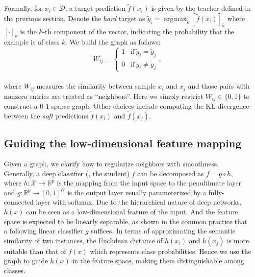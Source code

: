 \documentclass[10pt,twocolumn,letterpaper]{article}
\DeclareMathOperator*{\argmax}{\arg\!\max}
\begin{document}
Formally, for $x_i \in \mathcal{D}$, a target prediction $\tilde f(x_i)$ is given by the teacher defined in the previous section. Denote the \emph{hard} target as ${\tilde{y}}_{i} = \argmax_k\left[ \tilde{f}(x_i)\right] _k$ where $\left[ \cdot\right] _k$ is the $k$-th component of the vector, indicating the probability that the example is of class $k$. We build the graph as follows:\\[-.3cm]
\begin{equation}\label{eq:W}
W_{ij} = \left \{ \begin{array}{ll}
1 & \text{if} ~ {\tilde{y}}_{i} = {\tilde{y}}_{j}  \\
0 & \text{if} ~ {\tilde{y}}_{i}  \not = {\tilde{y}}_{j}
\end{array} \right . ,
\end{equation}\\[-.3cm]
where $W_{ij}$ measures the similarity between sample $x_i$ and $x_j$ and those pairs with nonzero entries are treated as ``neighbors''. Here we simply restrict $W_{ij} \in \{0,1\}$ to construct a $0$-$1$ sparse graph.
Other choices include computing the KL divergence between the {\it soft} predictions $\tilde f(x_i)$ and $\tilde f(x_j)$.

\subsection{Guiding the low-dimensional feature mapping}
\label{sec:mapping}
Given a graph, we clarify how to regularize neighbors with smoothness. Generally, a deep classifier (\ie, the student) $f$ can be decomposed as $ f = g \circ h$, where $h:\mathcal{X} \to \mathbb{R}^p$ is the mapping from the input space to the penultimate layer and $g :\mathbb{R}^p \to [0,1 ]^K$ is the output layer usually parameterized by a fully-connected layer with softmax. Due to the hierarchical nature of deep networks, $h(x)$ can be seen as a
low-dimensional feature of the input.
And the feature space is expected to be linearly separable, as shown in the common practice that a following linear classifier $g$ suffices. In terms of approximating the semantic similarity of two instances, the Euclidean distance of $h(x_i)$ and $h(x_j)$ is more suitable than that of $f(x)$ which represents class probabilities. Hence we use the graph to guide $h(x)$ in the feature space, making them distinguishable among classes.
\end{document}
